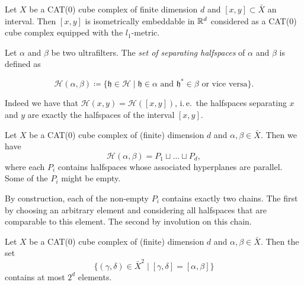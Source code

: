 \begin{thm}
  \label{thm:interval}
  Let \(X\) be a CAT(0) cube complex of finite dimension \(d\) and \([x,y] \subset \bar X\) an interval. Then \([x,y]\) is isometrically embeddable in \(\mathbb{R}^d\) considered as a CAT(0) cube complex equipped with the \(l_1\)-metric.
\end{thm}

\begin{defin}
  \label{defin:separating}
  Let \(\alpha\) and \(\beta\) be two ultrafilters. The \emph{set of separating halfspaces} of \(\alpha\) and \(\beta\) is defined as

  \[
    \mathcal{H}(\alpha,\beta) \coloneqq \{\mathfrak{h} \in \mathcal{H} \mid \mathfrak{h} \in \alpha \text{ and } \mathfrak{h}^\ast \in \beta \text{ or vice versa}\}.
  \]
\end{defin}

\begin{rem}
  \label{rem:interval}
  Indeed we have that \(\mathcal{H}(x,y) = \mathcal{H}([x,y])\), i.\,e.\ the halfspaces separating \(x\) and \(y\) are exactly the halfspaces of the interval \([x,y]\).
\end{rem}

\begin{lemma}
  \label{lem:b-1.16}
  Let \(X\) be a CAT(0) cube complex of (finite) dimension \(d\) and \(\alpha, \beta \in \bar X\). Then we have
  \[
    \mathcal{H}(\alpha, \beta) = P_1 \sqcup \dots \sqcup P_d,
  \]
  where each \(P_i\) contains halfspaces whose associated hyperplanes are parallel. Some of the \(P_i\) might be empty.
\end{lemma}

\begin{rem}
  \label{rem:b-1.16}
  By construction, each of the non-empty \(P_i\) contains exactly two chains. The first by choosing an arbitrary element and considering all halfspaces that are comparable to this element. The second by involution on this chain.
\end{rem}

\begin{cor}
  \label{cor:finite-interval}
  Let \(X\) be a CAT(0) cube complex of (finite) dimension \(d\) and \(\alpha, \beta \in \bar X\). Then the set
  \[
    \{(\gamma, \delta) \in \bar X^2 \mid [\gamma, \delta] = [\alpha, \beta]\}
  \]
  contains at most \(2^d\) elements.
\end{cor}


